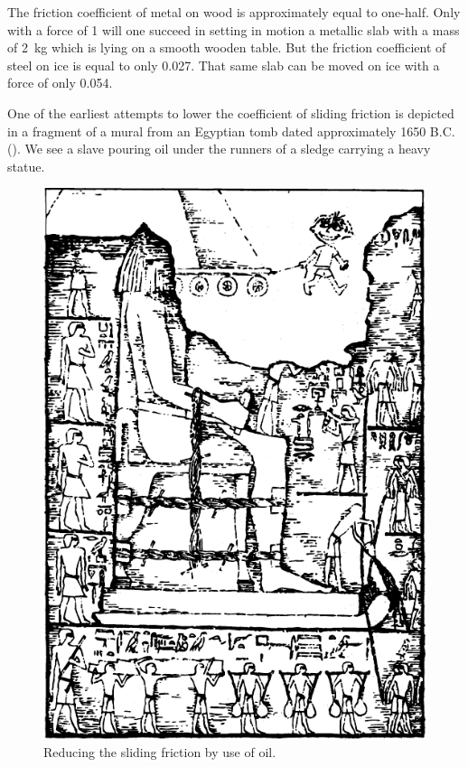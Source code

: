 The friction coefficient of metal on wood is approximate­ly equal to one-half. Only with a force of \SI{1}{\kgf} will one succeed in setting in motion a metallic slab with a mass of \SI{2}{\kilo\gram} which is lying on a smooth wooden table. But the friction coefficient of steel on ice is equal to only 0.027. That same slab can be moved on ice with a force of only \SI{0.054}{\kgf}.



One of the earliest attempts to lower the coefficient of sliding friction is depicted in a fragment of a mural from an Egyptian tomb dated approximately 1650 B.C. (). We see a slave pouring oil under the runners of a sledge carrying a heavy statue.
\clearpage

\begin{figure}[!h]
\centering
\includegraphics[width=\textwidth]{figures/fig-06-01.pdf}
\caption{Reducing the sliding friction by use of oil.}
\label{fig-6.1}
\end{figure}


